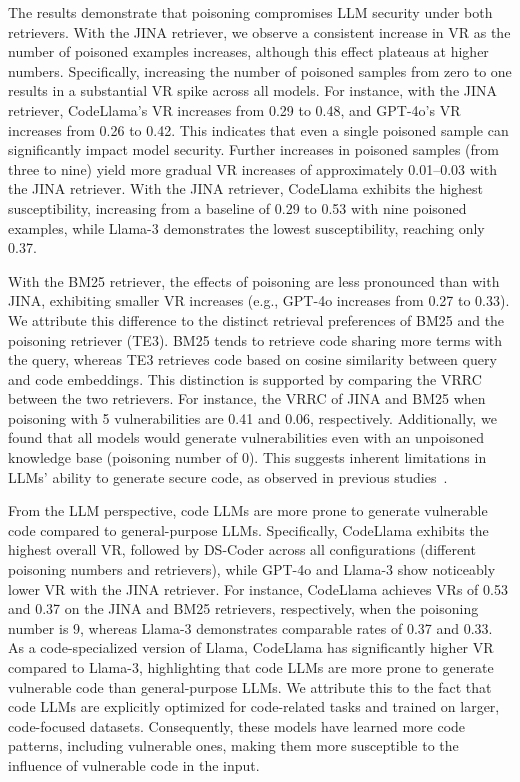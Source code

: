 The results demonstrate that poisoning compromises LLM security under both retrievers. With the JINA retriever, we observe a consistent increase in VR as the number of poisoned examples increases, although this effect plateaus at higher numbers. Specifically, increasing the number of poisoned samples from zero to one results in a substantial VR spike across all models. For instance, with the JINA retriever, CodeLlama's VR increases from 0.29 to 0.48, and GPT-4o's VR increases from 0.26 to 0.42. This indicates that even a single poisoned sample can significantly impact model security. Further increases in poisoned samples (from three to nine) yield more gradual VR increases of approximately 0.01--0.03 with the JINA retriever. With the JINA retriever, CodeLlama exhibits the highest susceptibility, increasing from a baseline of 0.29 to 0.53 with nine poisoned examples, while Llama-3 demonstrates the lowest susceptibility, reaching only 0.37.

With the BM25 retriever, the effects of poisoning are less pronounced than with JINA, exhibiting smaller VR increases (e.g., GPT-4o increases from 0.27 to 0.33). We attribute this difference to the distinct retrieval preferences of BM25 and the poisoning retriever (\ie TE3). BM25 tends to retrieve code sharing more terms with the query, whereas TE3 retrieves code based on cosine similarity between query and code embeddings. This distinction is supported by comparing the VRRC between the two retrievers. For instance, the VRRC of JINA and BM25 when poisoning with 5 vulnerabilities are 0.41 and 0.06, respectively. Additionally, we found that all models would generate vulnerabilities even with an unpoisoned knowledge base (poisoning number of 0). This suggests inherent limitations in LLMs' ability to generate secure code, as observed in previous studies~\cite{tihanyi2025secure,khoury2023secure}.

From the LLM perspective, code LLMs are more prone to generate vulnerable code compared to general-purpose LLMs. Specifically, CodeLlama exhibits the highest overall VR, followed by DS-Coder across all configurations (\ie different poisoning numbers and retrievers), while GPT-4o and Llama-3 show noticeably lower VR with the JINA retriever. For instance, CodeLlama achieves VRs of 0.53 and 0.37 on the JINA and BM25 retrievers, respectively, when the poisoning number is 9, whereas Llama-3 demonstrates comparable rates of 0.37 and 0.33. As a code-specialized version of Llama, CodeLlama has significantly higher VR compared to Llama-3, highlighting that code LLMs are more prone to generate vulnerable code than general-purpose LLMs.
We attribute this to the fact that code LLMs are explicitly optimized for code-related tasks and trained on larger, code-focused datasets. Consequently, these models have learned more code patterns, including vulnerable ones, making them more susceptible to the influence of vulnerable code in the input.



